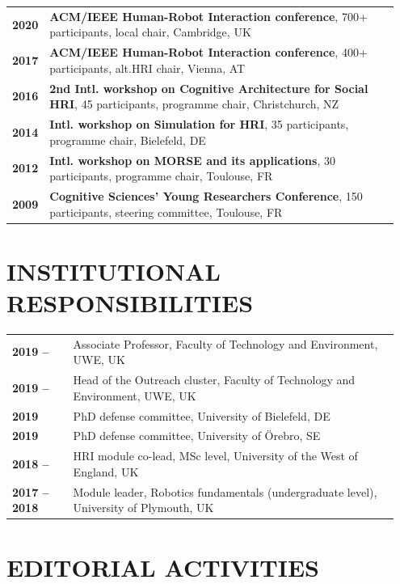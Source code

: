 \documentclass[11pt,a4paper]{report}
\begin{document}
\begin{tabular}{p{0.05\linewidth}p{0.9\linewidth}}
    \bf 2020 & \textbf{ACM/IEEE Human-Robot Interaction conference}, 700+ participants, local chair, Cambridge, UK \\
    \bf 2017 & \textbf{ACM/IEEE Human-Robot Interaction conference}, 400+
    participants, alt.HRI chair, Vienna, AT \\
    \bf 2016 & \textbf{2nd Intl. workshop on Cognitive Architecture for Social HRI}, 45 participants, programme chair, Christchurch, NZ \\
    \bf 2014 & \textbf{Intl. workshop on Simulation for HRI}, 35 participants, programme chair, Bielefeld, DE \\
    \bf 2012 & \textbf{Intl. workshop on MORSE and its applications}, 30 participants, programme chair, Toulouse, FR \\
    \bf 2009 & \textbf{Cognitive Sciences’ Young Researchers Conference}, 150 participants, steering committee, Toulouse, FR \\
\end{tabular}

\section{INSTITUTIONAL RESPONSIBILITIES}

\begin{tabular}{p{0.15\linewidth}p{0.8\linewidth}}
    \bf 2019 -- & Associate Professor, Faculty of Technology and Environment, UWE, UK \\
    \bf 2019 -- & Head of the Outreach cluster, Faculty of Technology and Environment, UWE, UK \\
    \bf 2019 & PhD defense committee, University of Bielefeld, DE \\
    \bf 2019 & PhD defense committee, University of Örebro, SE \\
    \bf 2018 -- & HRI module co-lead, MSc level, University of the West of England, UK  \\
    \bf 2017 -- 2018 & Module leader, Robotics fundamentals (undergraduate level), University of Plymouth, UK \\
\end{tabular}

\section{EDITORIAL ACTIVITIES}
\end{document}
